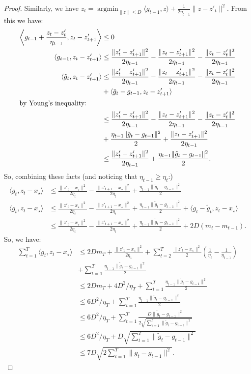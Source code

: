 \documentclass{article}
\begin{document}
\begin{proof}
Similarly, we have $z_t = \mathop{\text{argmin}}_{\|z\|\le D} \langle g_{t-1}, z\rangle + \frac{1}{2\eta_{t-1}} \|z-z'_t\|^2$. From this we have:
\begin{align*}
\left\langle  g_{t-1} + \frac{z_t-z'_t}{\eta_{t-1}}, z_t-z'_{t+1}\right\rangle &\le 0\\
\langle g_{t-1} ,z_t - z'_{t+1}\rangle &\le \frac{\|z'_t-z'_{t+1}\|^2}{2\eta_{t-1}} - \frac{\|z_t -z'_{t+1}\|^2}{2\eta_{t-1}} - \frac{\|z_t - z'_t\|^2}{2\eta_{t-1}}\\
\langle \tilde g_t , z_t - z'_{t+1}\rangle&\le \frac{\|z'_t-z'_{t+1}\|^2}{2\eta_{t-1}} - \frac{\|z_t -z'_{t+1}\|^2}{2\eta_{t-1}} - \frac{\|z_t - z'_t\|^2}{2\eta_{t-1}} \\
& +\langle \tilde g_t - g_{t-1}, z_t - z'_{t+1}\rangle\\
\intertext{by Young's inequality:}
&\le \frac{\|z'_t-z'_{t+1}\|^2}{2\eta_{t-1}} - \frac{\|z_t -z'_{t+1}\|^2}{2\eta_{t-1}} - \frac{\|z_t - z'_t\|^2}{2\eta_{t-1}}  \\
&+\frac{\eta_{t-1}\|\tilde g_t-g_{t-1}\|^2}{2}+ \frac{\|z_t-z'_{t+1}\|^2}{2\eta_{t-1}}\\
&\le \frac{\|z'_t-z'_{t+1}\|^2}{2\eta_{t-1}} +\frac{\eta_{t-1}\|\tilde g_t-g_{t-1}\|^2}{2} .
\end{align*}
So, combining these facts (and noticing that $\eta_{t-1}\ge \eta_t$:)
\begin{align*}
    \langle \tilde g_t, z_t - x_\star\rangle & \le \frac{\|z'_t-x_\star\|^2}{2\eta_t} -\frac{\|z'_{t+1}-x_\star\|^2}{2\eta_t} + \frac{\eta_{t-1}\|\tilde g_t-g_{t-1}\|^2}{2}\\
    \langle g_t, z_t -x_\star\rangle &\le \frac{\|z'_t-x_\star\|^2}{2\eta_t} -\frac{\|z'_{t+1}-x_\star\|^2}{2\eta_t} + \frac{\eta_{t-1}\|\tilde g_t-g_{t-1}\|^2}{2} + \langle g_t -\tilde g_t, z_t -x_\star\rangle\\
    &\le \frac{\|z'_t-x_\star\|^2}{2\eta_t} -\frac{\|z'_{t+1}-x_\star\|^2}{2\eta_t} + \frac{\eta_{t-1}\|\tilde g_t-g_{t-1}\|^2}{2} + 2D(m_t-m_{t-1}).
\end{align*}
So, we have:
\begin{align*}
    \sum_{t=1}^T \langle g_t, z_t - x_\star\rangle &\le 2Dm_T + \frac{\|z'_1-x_\star\|^2}{2\eta_1} + \sum_{t=2}^T \frac{\|z'_t-x_\star\|^2}{2}\left(\frac{1}{\eta_t} - \frac{1}{\eta_{t-1}}\right)\\ & + \sum_{t=1}^T \frac{\eta_{t-1}\|\tilde g_t-g_{t-1}\|^2}{2}\\
    &\le 2Dm_T + 4D^2/ \eta_T  + \sum_{t=1}^T \frac{\eta_{t-1} \|\tilde g_t - g_{t-1}\|^2}{2}\\
    &\le 6 D^2/\eta_T + \sum_{t=1}^T \frac{\eta_{t-1} \|\tilde g_t - g_{t-1}\|^2}{2}\\
    &\le 6 D^2/\eta_T + \sum_{t=1}^T \frac{D \|\tilde g_t - g_{t-1}\|^2}{2\sqrt{\sum_{i=1}^t\|\tilde g_i-g_{i-1}\|^2} }\\
    &\le 6 D^2/\eta_T + D \sqrt{\sum_{t=1}^T \|\tilde g_t - g_{t-1}\|^2}\\
    &\le 7D \sqrt{2\sum_{t=1}^T \|g_t-g_{t-1}\|^2}.
\end{align*}



\end{proof}
\end{document}
